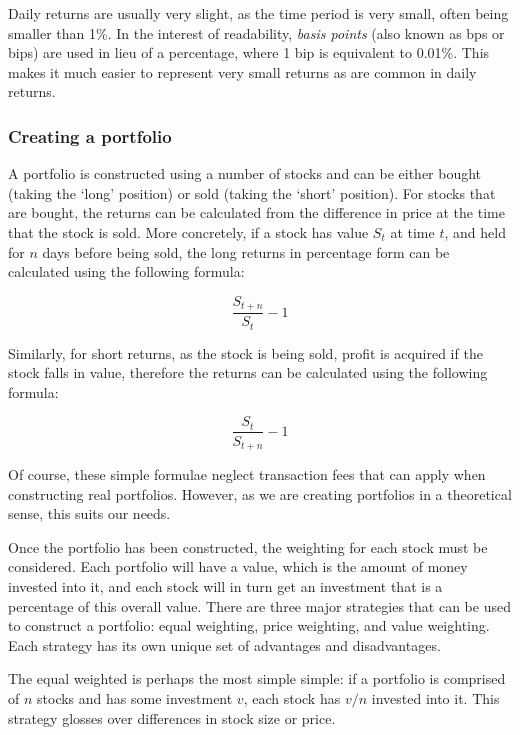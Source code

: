 Daily returns are usually very slight, as the time period is very small, often being smaller than 1\%. In the interest of readability, \textit{basis points} (also known as bps or bips) are used in lieu of a percentage, where 1 bip is equivalent to 0.01\%. This makes it much easier to represent very small returns as are common in daily returns.

\subsubsection{Creating a portfolio}
\label{ssub:portfolio-creation}
A portfolio is constructed using a number of stocks and can be either bought (taking the `long' position) or sold (taking the `short' position). For stocks that are bought, the returns can be calculated from the difference in price at the time that the stock is sold. More concretely, if a stock has value $S_{t}$ at time $t$, and held for $n$ days before being sold, the long returns in percentage form can be calculated using the following formula:

\begin{equation}
\frac{S_{t+n}}{S_{t}} - 1
\end{equation}

\noindent
Similarly, for short returns, as the stock is being sold, profit is acquired if the stock falls in value, therefore the returns can be calculated using the following formula:

\begin{equation}
\frac{S_{t}}{S_{t+n}} - 1
\end{equation}

\noindent
Of course, these simple formulae neglect transaction fees that can apply when constructing real portfolios. However, as we are creating portfolios in a theoretical sense, this suits our needs.

Once the portfolio has been constructed, the weighting for each stock must be considered. Each portfolio will have a value, which is the amount of money invested into it, and each stock will in turn get an investment that is a percentage of this overall value. There are three major strategies that can be used to construct a portfolio: equal weighting, price weighting, and value weighting. Each strategy has its own unique set of advantages and disadvantages.

The equal weighted is perhaps the most simple simple: if a portfolio is comprised of $n$ stocks and has some investment $v$, each stock has $v/n$ invested into it. This strategy glosses over differences in stock size or price.

